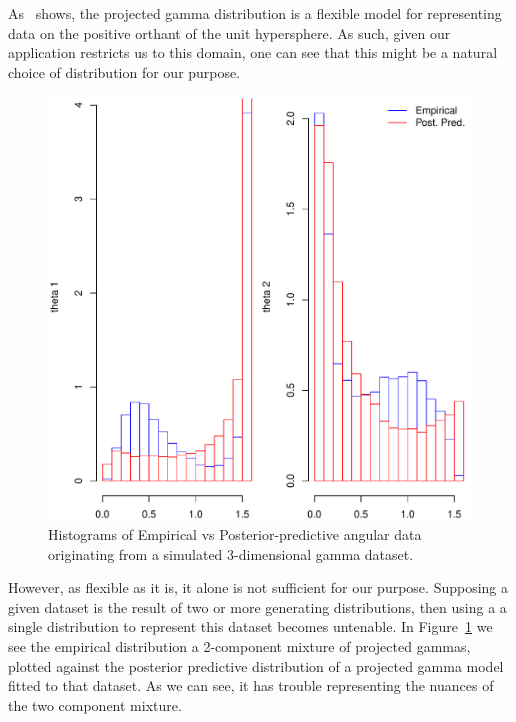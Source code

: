 As~\cite{nunez2019} shows, the projected gamma distribution is a flexible model
  for representing data on the positive orthant of the unit hypersphere.  As such,
  given our application restricts us to this domain, one can see that this might be a
  natural choice of distribution for our purpose.

\begin{figure}[h!]
  \centering
  \label{fig:vanillamix}
  \includegraphics[width=5in]{./images/justification_for_more_complex_models}
  \caption{Histograms of Empirical vs Posterior-predictive angular data originating
            from a simulated 3-dimensional gamma dataset.}
\end{figure}

However, as flexible as it is, it alone is not sufficient for our purpose.  Supposing
  a given dataset is the result of two or more generating distributions, then using a
  a single distribution to represent this dataset becomes untenable.  In Figure~\ref{fig:vanillamix}
  we see the empirical distribution a 2-component mixture of projected gammas, plotted
  against the posterior predictive distribution of a projected gamma model fitted to
  that dataset.  As we can see, it has trouble representing the nuances of the two
  component mixture.



